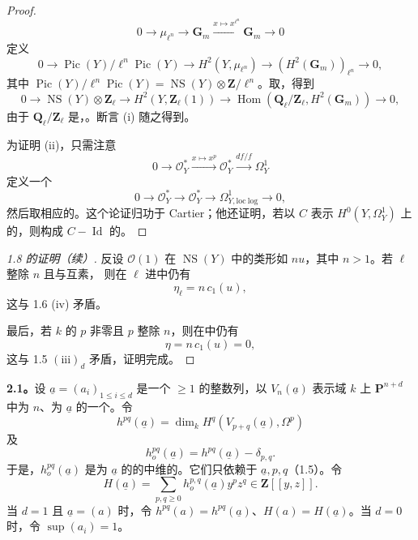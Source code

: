 \begin{proof}
\[
0\longrightarrow\mu_{\ell^n}\longrightarrow\mathbf G_m\xrightarrow{x\mapsto x^{\ell^n}}\mathbf G_m\longrightarrow0
\]
定义
\[
0\longrightarrow\operatorname{Pic}(Y)/\ell^n\operatorname{Pic}(Y)\longrightarrow H^2(Y,\mu_{\ell^n})\longrightarrow(H^2(\mathbf G_m))_{\ell^n}\longrightarrow0,
\]
其中 $\operatorname{Pic}(Y)/\ell^n\operatorname{Pic}(Y)=\operatorname{NS}(Y)\otimes\mathbf Z/\ell^n$。取，得到
\[
0\longrightarrow\operatorname{NS}(Y)\otimes\mathbf Z_\ell\longrightarrow H^2(Y,\mathbf Z_\ell(1))\longrightarrow\operatorname{Hom}(\mathbf Q_\ell/\mathbf Z_\ell,H^2(\mathbf G_m))\longrightarrow0,
\]
由于 $\mathbf Q_\ell/\mathbf Z_\ell$ 是，。断言 (i) 随之得到。

为证明 (ii)，只需注意
\[
0\longrightarrow\mathcal O_Y^*\xrightarrow{x\mapsto x^p}\mathcal O_Y^*\xrightarrow{df/f}\Omega_Y^1
\]
定义一个
\[
0\longrightarrow\mathcal O_Y^*\longrightarrow\mathcal O_Y^*\longrightarrow\Omega^1_{Y,\mathrm{loc\ log}}\longrightarrow0,
\]
然后取相应的。这个论证归功于 Cartier；他还证明，若以 $C$ 表示 $H^0(Y,\Omega_Y^1)$ 上的，则构成 $C-\operatorname{Id}$ 的。
\end{proof}
\begin{proof}[ 1.8 的证明（续）]
反设 $\mathcal O(1)$ 在 $\operatorname{NS}(Y)$ 中的类形如 $nu$，其中 $n>1$。若 $\ell$ 整除 $n$ 且与互素，
则在 $\ell$ 进中仍有
\[
 \eta_\ell=n\,c_1(u),
\]
这与 1.6 (iv) 矛盾。

最后，若 $k$ 的 $p$ 非零且 $p$ 整除 $n$，则在中仍有
\[
 \eta=n\,c_1(u)=0,
\]
这与 1.5 $(\mathrm{iii})_d$ 矛盾，证明完成。
\end{proof}

\textbf{2.1。}设 $\underline a=(a_i)_{1\leq i\leq d}$ 是一个 $\geq1$ 的整数列，以 $V_n(\underline a)$ 表示域 $k$ 上 $\mathbf P^{n+d}$ 中为 $n$、为 $\underline a$ 的一个。令
\[
 h^{pq}(\underline a)=\dim_k H^q(V_{p+q}(\underline a),\Omega^p)
\]
及
\[
 h_o^{pq}(\underline a)=h^{pq}(\underline a)-\delta_{p,q}.
\]
于是，$h_o^{pq}(\underline a)$ 是为 $\underline a$ 的的中维的。它们只依赖于 $\underline a,p,q$（1.5）。令
\[
 H(\underline a)=\sum_{p,q\geq0}h_o^{p,q}(\underline a)y^pz^q\in\mathbf Z[[y,z]].\tag{2.1.1}
\]
当 $d=1$ 且 $\underline a=(a)$ 时，令 $h^{pq}(a)=h^{pq}(\underline a)$、$H(a)=H(\underline a)$。当 $d=0$ 时，令 $\sup(a_i)=1$。

